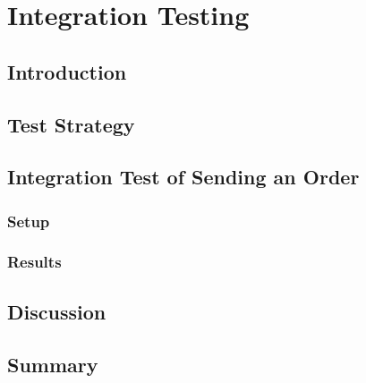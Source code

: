 \chapter{Integration Testing}\label{ch:integration-testing}

\section{Introduction}\label{sec:int-introduction}

\section{Test Strategy}\label{sec:int-strategy}

\section{Integration Test of Sending an Order}\label{sec:int-send-order}

\subsection{Setup}

\subsection{Results}

\section{Discussion}\label{sec:int-discussion}

\section{Summary}\label{sec:int-summary}
